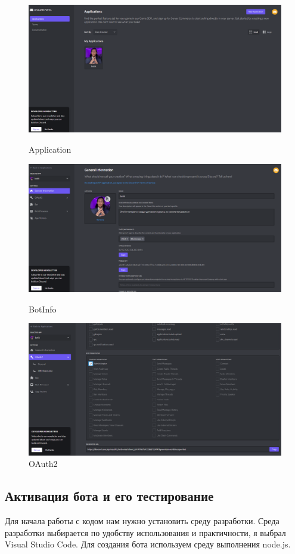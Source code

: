 \documentclass[a4paper,12pt]{article}
\begin{document}
\begin{figure}
    \centering
    \includegraphics[width = 430px]{pictures/application.png}
    \caption{Application}
    \label{fig:my_label2}
    \includegraphics[width = 430px]{pictures/bot.png}
    \caption{BotInfo}
    \label{fig:my_label3}
    \includegraphics[width = 430px]{pictures/oauth2.png}
    \caption{OAuth2}
    \label{fig:my_label4}
\end{figure}

\newpage
\subsection{Активация бота и его тестирование}
Для начала работы с кодом нам нужно установить среду разработки.
Среда разработки выбирается по удобству использования и практичности, я выбрал Visual Studio Code.
Для создания бота используем среду выполнения node.js.
\end{document}
